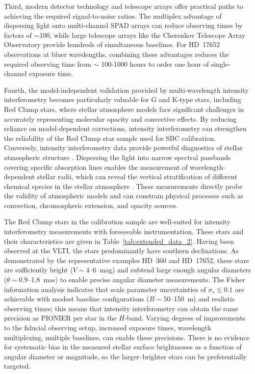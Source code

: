 \documentclass[linenumbers,trackchanges,margins]{aastex701}
\begin{document}
Third, modern detector technology and telescope arrays offer practical paths to achieving the required signal-to-noise ratios. The multiplex advantage of dispersing light onto multi-channel SPAD arrays can reduce observing times by factors of $\sim$100, while large telescope arrays like the Cherenkov Telescope Array Observatory provide hundreds of simultaneous baselines. For HD~17652 observations at bluer wavelengths, combining these advantages reduces the required observing time from $\sim$ 100-1000 hours to order one hour of single-channel exposure time.

Fourth, the model-independent validation provided by multi-wavelength intensity interferometry becomes particularly valuable for G and K-type stars, including Red Clump stars, where stellar atmosphere models face significant challenges in accurately representing molecular opacity and convective effects. By reducing reliance on model-dependent corrections, intensity interferometry can strengthen the reliability of the Red Clump star sample used for SBC calibration.
Conversely, intensity interferometry data provide powerful diagnostics of stellar atmospheric structure \citep{2004A&A...413..711W}. Dispersing the light into narrow spectral passbands covering specific absorption lines enables the measurement of wavelength-dependent stellar radii, which can reveal the vertical stratification of different chemical species in the stellar atmosphere \citep{presentation_Aufdenberg}. These measurements directly probe the validity of atmospheric models and can constrain physical processes such as convection, chromospheric extension, and opacity sources.

The Red Clump stars in the \citet{2019Natur.567..200P} calibration sample are well-suited for intensity interferometry measurements with foreseeable instrumentation. 
These stars and their characteristics
are given in Table~\ref{tab:extended_data_2}.  Having been observed at the VLTI, the stars predominantly have southern declinations.
As demonstrated by the representative examples HD~360 and HD~17652, these stars are sufficiently bright ($V \sim 4$--6~mag) and subtend large enough angular diameters ($\theta \sim 0.9$--1.8~mas) to enable precise angular diameter measurements.
The Fisher information analysis indicates that scale parameter uncertainties of $\sigma_s \lesssim 0.1$
are achievable with modest baseline configurations ($B \sim 50$--150~m) and realistic observing times;
this means that intensity interferometry
can obtain the same precision as PIONIER per star in the $H$-band.  
Varying degrees of improvements to the fiducial observing setup, increased exposure times, wavelength multiplexing, multiple baselines, can enable these precisions.
There is no evidence for systematic bias in the measured stellar surface brightnesses as a function
of angular diameter or magnitude, so the larger--brighter stars can be preferentially targeted.       
\end{document}
